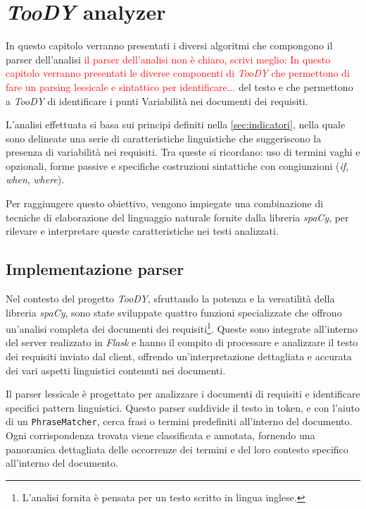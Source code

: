 \documentclass[12pt]{report}
\newcommand{\torevise}[1]{\textcolor{red}{#1}}
\newcommand{\toody}{\textsl{TooDY}\xspace}
\newcommand{\flask}{\textsl{Flask}\xspace}
\newcommand{\spacy}{\textsl{spaCy}\xspace}
\begin{document}
\clearpage\thispagestyle{empty}
\null\newpage




\chapter{\toody analyzer}
\label{ch:parser}
In questo capitolo verranno presentati i diversi algoritmi che compongono il parser dell'analisi \torevise{il parser dell'analisi non è chiaro, scrivi meglio: In questo capitolo verranno presentati le diverse componenti di \toody che permettono di fare un parsing lessicale e sintattico per identificare...} del testo e che permettono a \toody di identificare i punti Variabilità nei documenti dei requisiti.

L'analisi effettuata si basa sui principi definiti nella \cref{sec:indicatori}, nella quale sono delineate una serie di caratteristiche linguistiche che suggeriscono la presenza di variabilità nei requisiti. Tra queste si ricordano: uso di termini vaghi e opzionali, forme passive e specifiche costruzioni sintattiche con congiunzioni (\textit{if}, \textit{when}, \textit{where}).

Per raggiungere questo obiettivo, vengono impiegate una combinazione di tecniche di elaborazione del linguaggio naturale fornite dalla libreria \spacy, per rilevare e interpretare queste caratteristiche nei testi analizzati.


\section{Implementazione parser}
Nel contesto del progetto \toody, sfruttando la potenza e la versatilità della libreria \spacy, sono state sviluppate quattro funzioni specializzate che offrono un'analisi completa dei documenti dei requisiti\footnote{L'analisi fornita è pensata per un testo scritto in lingua inglese.}. Queste sono integrate all'interno del server realizzato in \flask e hanno il compito di processare e analizzare il testo dei requisiti inviato dal client, offrendo un'interpretazione dettagliata e accurata dei vari aspetti linguistici contenuti nei documenti.

Il \textsf{parser lessicale} è progettato per analizzare i documenti di requisiti e identificare specifici pattern linguistici. Questo parser suddivide il testo in token, e con l'aiuto di un \texttt{PhraseMatcher}, cerca frasi o termini predefiniti all'interno del documento. Ogni corrispondenza trovata viene classificata e annotata, fornendo una panoramica dettagliata delle occorrenze dei termini e del loro contesto specifico all'interno del documento.
\end{document}
